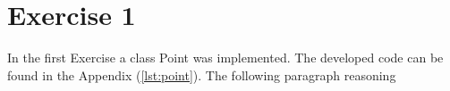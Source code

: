 \chapter{Exercise 1}

In the first Exercise a class Point was implemented.
The developed code can be found in the Appendix (\ref{lst:point}).
The following paragraph reasoning 